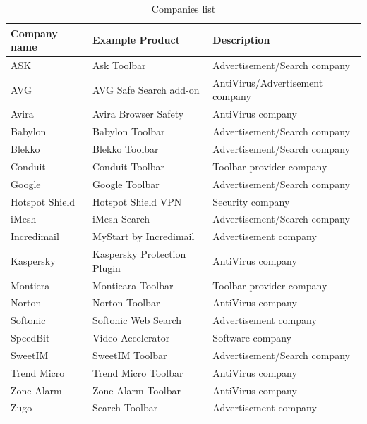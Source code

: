 \documentclass[11pt,oneside]{book}
\begin{document}
\begin{table}[h]
\centering
\caption{Companies list}
\label{table:companies_list}
\begin{tabular}{@{}lll@{}}
\toprule
{\bf Company name} & {\bf Example Product}               & {\bf Description}               \\ \midrule
ASK                & Ask Toolbar                 & Advertisement/Search company    \\
AVG                & AVG Safe Search add-on      & AntiVirus/Advertisement company \\
Avira              & Avira Browser Safety        & AntiVirus company               \\
Babylon            & Babylon Toolbar             & Advertisement/Search company    \\
Blekko             & Blekko Toolbar              & Advertisement/Search company    \\
Conduit            & Conduit Toolbar             & Toolbar provider company        \\
Google             & Google Toolbar              & Advertisement/Search company    \\
Hotspot Shield     & Hotspot Shield VPN          & Security company                \\
iMesh              & iMesh Search                & Advertisement/Search company    \\
Incredimail        & MyStart by Incredimail      & Advertisement company           \\
Kaspersky          & Kaspersky Protection Plugin & AntiVirus company               \\
Montiera           & Montieara Toolbar            & Toolbar provider company        \\
Norton             & Norton Toolbar              & AntiVirus company               \\
Softonic           & Softonic Web Search         & Advertisement company           \\
SpeedBit           & Video Accelerator           & Software company                \\
SweetIM            & SweetIM Toolbar             & Advertisement/Search company    \\
Trend Micro        & Trend Micro Toolbar         & AntiVirus company               \\
Zone Alarm         & Zone Alarm Toolbar          & AntiVirus company               \\ 
Zugo               & Search Toolbar              & Advertisement company           \\ \bottomrule
\end{tabular}
\end{table}
\end{document}
